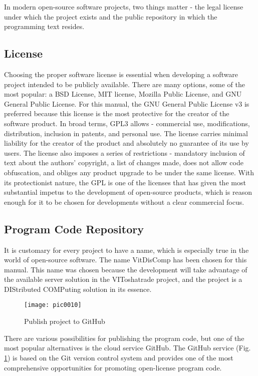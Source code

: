 In modern open-source software projects, two things matter - the legal license under which the project exists and the public repository in which the programming text resides.

\subsection{License}

Choosing the proper software license is essential when developing a software project intended to be publicly available. There are many options, some of the most popular: a BSD License, MIT license, Mozilla Public License, and GNU General Public License. For this manual, the GNU General Public License v3 is preferred because this license is the most protective for the creator of the software product. In broad terms, GPL3 allows - commercial use, modifications, distribution, inclusion in patents, and personal use. The license carries minimal liability for the creator of the product and absolutely no guarantee of its use by users. The license also imposes a series of restrictions - mandatory inclusion of text about the authors' copyright, a list of changes made, does not allow code obfuscation, and obliges any product upgrade to be under the same license. With its protectionist nature, the GPL is one of the licenses that has given the most substantial impetus to the development of open-source products, which is reason enough for it to be chosen for developments without a clear commercial focus.

\subsection{Program Code Repository}

It is customary for every project to have a name, which is especially true in the world of open-source software. The name VitDisComp has been chosen for this manual. This name was chosen because the development will take advantage of the available server solution in the VIToshatrade \cite{vtrade} project, and the project is a DIStributed COMPuting solution in its essence.

\begin{figure}[h]
\centering
\texttt{[image: pic0010]}
\caption{Publish project to GitHub}
\label{fig:pic0010}
\end{figure}

There are various possibilities for publishing the program code, but one of the most popular alternatives is the cloud service GitHub. The GitHub service (Fig. \ref{fig:pic0010}) is based on the Git version control system and provides one of the most comprehensive opportunities for promoting open-license program code.
